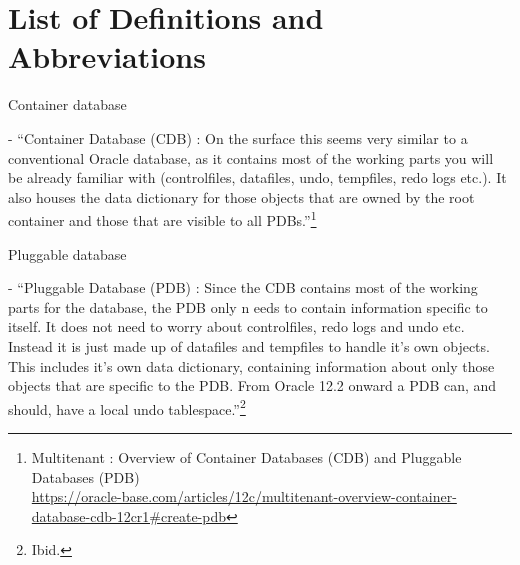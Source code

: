 

\newpage
\setcounter{secnumdepth}{0}
\section{List of Definitions and Abbreviations}

\noindent\begin{itemize*}

\item{\begin{bf}Container database\end{bf}} - ``Container Database (CDB) : On 
the surface this seems very similar to a conventional Oracle database, as it 
contains most of the working parts you will be already familiar with 
(controlfiles, datafiles, undo, tempfiles, redo logs etc.). It also houses 
the data dictionary for those objects that are owned by the root container 
and those that are visible to all PDBs.''\footnote{Multitenant : Overview of Container Databases (CDB) and Pluggable Databases (PDB)\\
\href{https://oracle-base.com/articles/12c/multitenant-overview-container-database-cdb-12cr1\#create-pdb}{https://oracle-base.com/articles/12c/multitenant-overview-container-database-cdb-12cr1\#create-pdb}}


%
\item{\begin{bf}Pluggable database\end{bf}} - ``Pluggable Database (PDB) : Since 
the CDB contains most of the working parts for the database, the PDB only n
eeds to contain information specific to itself. It does not need to worry about 
controlfiles, redo logs and undo etc. Instead it is just made up of datafiles 
and tempfiles to handle it's own objects. This includes it's own data dictionary, 
containing information about only those objects that are specific to the PDB. 
From Oracle 12.2 onward a PDB can, and should, have a local undo tablespace.''\footnote{Ibid.}






\end{itemize*}

